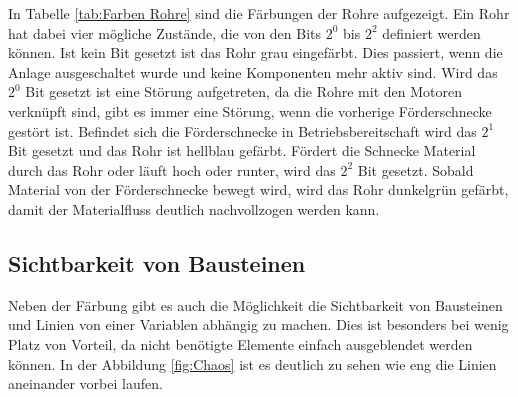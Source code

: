 In Tabelle \ref{tab:Farben Rohre} sind die Färbungen der Rohre aufgezeigt. Ein Rohr hat dabei vier mögliche Zustände, die von den Bits $2^{0}$ bis $2^{2}$ definiert werden können. Ist kein Bit gesetzt ist das Rohr grau eingefärbt. Dies passiert, wenn die Anlage ausgeschaltet wurde und keine Komponenten mehr aktiv sind. Wird das $2^{0}$ Bit gesetzt ist eine Störung aufgetreten, da die Rohre mit den Motoren verknüpft sind, gibt es immer eine Störung, wenn die vorherige Förderschnecke gestört ist. Befindet sich die Förderschnecke in Betriebsbereitschaft wird das $2^{1}$ Bit gesetzt und das Rohr ist hellblau gefärbt. Fördert die Schnecke Material durch das Rohr oder läuft hoch oder runter, wird das $2^{2}$ Bit gesetzt. Sobald Material von der Förderschnecke bewegt wird, wird das Rohr dunkelgrün gefärbt, damit der Materialfluss deutlich nachvollzogen werden kann. 

\subsection{Sichtbarkeit von Bausteinen}

Neben der Färbung gibt es auch die Möglichkeit die Sichtbarkeit von Bausteinen und Linien von einer Variablen abhängig zu machen. Dies ist besonders bei wenig Platz von Vorteil, da nicht benötigte Elemente einfach ausgeblendet werden können. In der Abbildung \ref{fig:Chaos} ist es deutlich zu sehen wie eng die Linien aneinander vorbei laufen. 

\begin{figure}[H] %
\end{figure} %

